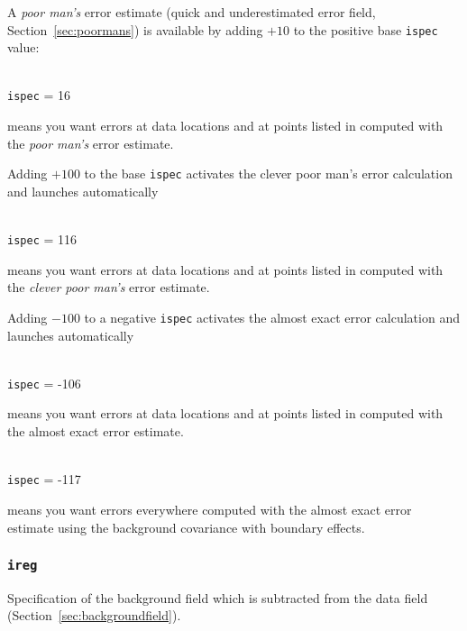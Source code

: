 A \textit{poor man's} error estimate (quick and underestimated error field, Section~\ref{sec:poormans}) is available by adding $+10$ to the positive base \texttt{ispec} value:

\example\\
\texttt{ispec}             = 16 \qquad \begin{minipage}[t]{.7\textwidth}{means you want errors at data locations and at points listed in  computed with the \textit{poor man's} error estimate.}\end{minipage}



Adding $+100$ to the base \texttt{ispec} activates  the clever poor man's error calculation and launches automatically 

\example\\
\texttt{ispec}             = 116 \qquad \begin{minipage}[t]{.7\textwidth}{means you want errors at data locations and at points listed in  computed with the \textit{clever poor man's} error estimate.}\end{minipage}

Adding $-100$ to a negative \texttt{ispec} activates the almost exact error calculation and launches automatically 

\example\\
\texttt{ispec}             = -106 \qquad \begin{minipage}[t]{.7\textwidth}{means you want errors at data locations and at points listed in  computed with the almost exact error estimate.}\end{minipage}



\example\\
\texttt{ispec}             = -117 \qquad \begin{minipage}[t]{.7\textwidth}{means you want errors everywhere computed with the almost exact error estimate using the background covariance with boundary effects.}\end{minipage}






\subsubsection{\texttt{ireg}}

Specification of the background field which is subtracted from the data field (Section~\ref{sec:backgroundfield}).

